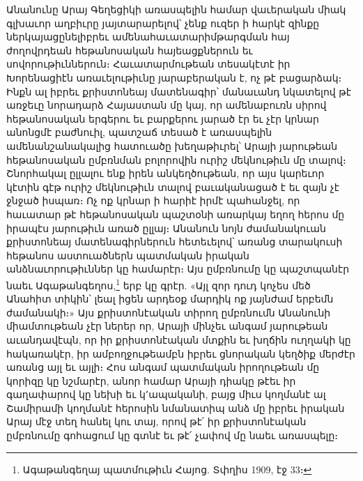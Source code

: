 \documentclass{article}
\begin{document}
{Անանունը Արայ Գեղեցիկի առասպելին համար վաւերական միակ գլխաւոր աղբիւրը յայտարարելով՝ չենք ուզեր ի հարկէ զինքը ներկայացընելիբրեւ ամենահաւատարիմթարգման հայ ժողովրդեան հեթանոսական հայեացքներուն եւ սովորութիւններուն։ Հաւատարմութեան տեսակէտէ իր Խորենացիէն առաւելութիւնը յարաբերական է, ոչ թէ բացարձակ։ Ինքն ալ իբրեւ քրիստոնեայ մատենագիր՝ մանաւանդ նկատելով թէ առջեւը նորադարձ Հայաստան մը կայ, որ ամենաբուռն սիրով հեթանոսական երգերու եւ բարքերու յարած էր եւ չէր կրնար անոնցմէ բաժնուիլ, պատշաճ տեսած է առասպելին ամենանշանակալից հատուածը խեղաթիւրել՝ Արայի յարութեան հեթանոսական ըմբռնման բոլորովին ուրիշ մեկնութիւն մը տալով։ Շնորհակալ ըլլալու ենք իրեն անկեղծութեան, որ այս կարեւոր կէտին գէթ ուրիշ մեկնութիւն տալով բաւականացած է եւ զայն չէ ջնջած իսպառ։ Ոչ ոք կրնար ի հարիէ իրմէ պահանջել, որ հաւատար թէ հեթանոսական պաշտօնի առարկայ եղող հերոս մը իրապէս յարութիւն առած ըլլայ։ Անանուն նոյն ժամանակուան քրիստոնեայ մատենագիրներուն հետեւելով՝ առանց տարակուսի հեթանոս աստուածներն պատմական իրական անձնաւորութիւններ կը համարէր։ Այս ըմբռնումը կը պաշտպանէր նաեւ Ագաթանգեղոս,\footnote{Ագաթանգեղայ պատմութիւն Հայոց. Տփղիս 1909, էջ 33։} երբ կը գրէր. «Այլ զոր դուդ կոչես մեծ Անահիտ տիկին՝ լեալ իցեն արդեօք մարդիկ ոք յայնժամ երբեմն ժամանակի։» Այս քրիստոնէական տիրող ըմբռնումն Անանունի միամտութեան չէր ներեր որ, Արայի մինչեւ անգամ յարութեան աւանդավէպն, որ իր քրիստոնէական մտքին եւ խղճին ուղղակի կը հակառակէր, իր ամբողջութեամբն իբրեւ ցնորական կեղծիք մերժէր առանց այլ եւ այլի։ Հոս անգամ պատմական իրողութեան մը կորիզը կը նշմարէր, անոր համար Արայի դիակը թէեւ իր գաղափարով կը նեխի եւ կ՚ապականի, բայց միւս կողմանէ ալ Շամիրամի կողմանէ հերոսին նմանատիպ անձ մը իբրեւ իրական Արայ մէջ տեղ հանել կու տայ, որով թէ՛ իր քրիստոնէական ըմբռնումը գոհացում կը գտնէ եւ թէ՛ չափով մը նաեւ առասպելը։

}
\end{document}
